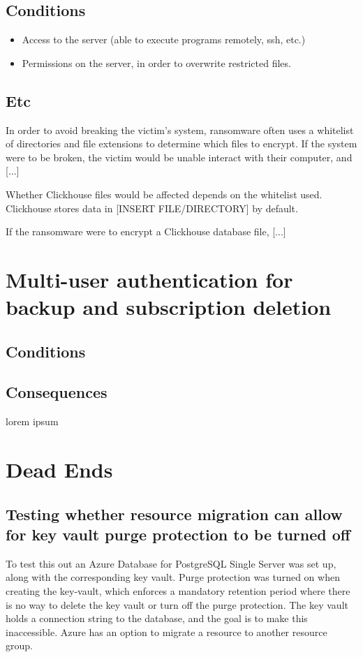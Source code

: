 \subsection{Conditions}

\begin{itemize}
    \item Access to the server (able to execute programs remotely, ssh, etc.)
    \item Permissions on the server, in order to overwrite restricted files.
\end{itemize}

\subsection{Etc}

In order to avoid breaking the victim's system,
ransomware often uses a whitelist of directories and file extensions to determine which files to encrypt.
If the system were to be broken, the  victim would be unable interact with their computer,
and [...]

Whether Clickhouse files would be affected depends on the whitelist used.
Clickhouse stores data in [INSERT FILE/DIRECTORY] by default. 

If the ransomware were to encrypt a Clickhouse database file, [...]


\section{Multi-user authentication for backup and subscription deletion}
\subsection{Conditions}


\subsection{Consequences}

lorem ipsum

\subsection{}

\section{Dead Ends}

\subsection{Testing whether resource migration can allow for key vault purge protection to be turned off}
To test this out an Azure Database for PostgreSQL Single Server was set up, along with the corresponding key vault. Purge protection was turned on when creating the key-vault, which enforces a mandatory retention period where there is no way to delete the key vault or turn off the purge protection. The key vault holds a connection string to the database, and the goal is to make this inaccessible. Azure has an option to migrate a resource to another resource group. 

